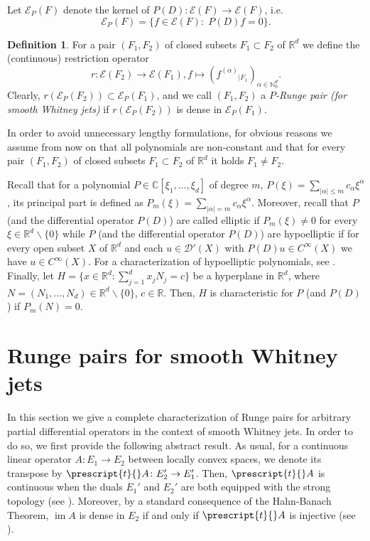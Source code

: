 \documentclass[10pt,leqno]{amsart}
\theoremstyle{definition}
\newtheorem{definition}[prop]{Definition}
\newcommand{\R}{\mathbb R}
\newcommand{\N}{\mathbb N}
\newcommand{\C}{\mathbb C}
\newcommand{\im}{\operatorname{im}}
\begin{document}
Let $\mathscr{E}_P(F)$ denote the kernel of $P(D)\colon\mathscr{E}(F)\to\mathscr{E}(F)$, i.e.
$$\mathscr{E}_P(F)=\{f\in\mathscr{E}(F):\;P(D)f=0\}.$$

\begin{definition}\label{definition:P-Runge pair}
	For a pair $(F_1,F_2)$ of closed subsets $F_1\subset F_2$ of $\R^d$ we define the (continuous) restriction operator
	\begin{equation}\label{eq-restriction-operator}
		r\colon\mathscr{E}(F_2)\to\mathscr{E}(F_1), f\mapsto\left({f^{(\alpha)}}_{\mid F_1}\right)_{\alpha\in\N_0^d}.
	\end{equation}
	Clearly, $r\left(\mathscr{E}_P(F_2)\right)\subset\mathscr{E}_P(F_1)$, and we call $(F_1, F_2)$ a \emph{$P$-Runge pair (for smooth Whitney jets)} if $r\left(\mathscr{E}_P(F_2)\right)$ is dense in $\mathscr{E}_P(F_1)$.
\end{definition}

In order to avoid unnecessary lengthy formulations, for obvious reasons we assume from now on that all polynomials are non-constant and that for every pair $(F_1,F_2)$ of closed subsets $F_1\subset F_2$ of $\R^d$ it holds $F_1\neq F_2$.

Recall that for a polynomial $P\in\C[\xi_1,\ldots,\xi_d]$ of degree $m$, $P(\xi)=\sum_{|\alpha|\leq m}c_\alpha \xi^\alpha$, its principal part is defined as $P_m(\xi)=\sum_{|\alpha|= m}c_\alpha \xi^\alpha$. Moreover, recall that $P$ (and the differential operator $P(D)$) are called elliptic if $P_m(\xi)\neq 0$ for every $\xi\in\R^d\backslash\{0\}$ while $P$ (and the differential operator $P(D)$) are hypoelliptic if for every open subset $X$ of $\R^d$ and each $u\in\mathscr{D}'(X)$ with $P(D)u\in C^\infty(X)$ we have $u\in C^\infty(X)$. For a characterization of hypoelliptic polynomials, see \cite[Section 11.1]{Hor2}. Finally, let $H=\{x\in\R^d\colon \sum_{j=1}^d x_jN_j=c\}$ be a hyperplane in $\R^d$, where $N=(N_1,\ldots,N_d)\in\R^d\backslash\{0\}$, $c\in \R$. Then, $H$ is characteristic for $P$ (and $P(D)$) if $P_m(N)=0$.

\section{Runge pairs for smooth Whitney jets}\label{section:arbitrary operators}

In this section we give a complete characterization of Runge pairs for arbitrary partial differential operators in the context of smooth Whitney jets. In order to do so, we first provide the following abstract result. As usual, for a continuous linear operator $A\colon E_1\to E_2$ between locally convex spaces, we denote its transpose by
$\prescript{t}{}A\colon E_2'\to E_1'$. Then, $\prescript{t}{}A$ is continuous when the duals $E_1'$ and $E_2'$ are both equipped with the strong topology (see \cite[Proposition 23.30]{MeV}). Moreover, by a standard consequence of the Hahn-Banach Theorem, $\im A$ is dense in $E_2$ if and only if $\prescript{t}{}A$ is injective (see \cite[Lemma 23.31]{MeV}).
\end{document}
